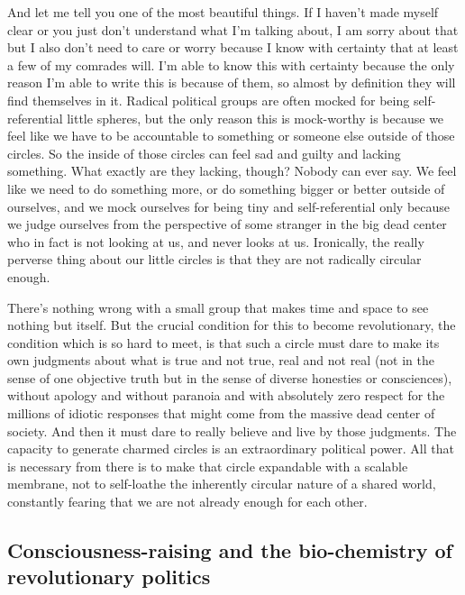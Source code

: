 \documentclass[a4paper,12pt,margin=.5in]{article}
\begin{document}
And let me tell you one of the most beautiful things. If I haven't made
myself clear or you just don't understand what I'm talking about, I am
sorry about that but I also don't need to care or worry because I know
with certainty that at least a few of my comrades will. I'm able to know
this with certainty because the only reason I'm able to write this is
because of them, so almost by definition they will find themselves in
it. Radical political groups are often mocked for being self-referential
little spheres, but the only reason this is mock-worthy is because we
feel like we have to be accountable to something or someone else outside
of those circles. So the inside of those circles can feel sad and guilty
and lacking something. What exactly are they lacking, though? Nobody can
ever say. We feel like we need to do something more, or do something
bigger or better outside of ourselves, and we mock ourselves for being
tiny and self-referential only because we judge ourselves from the
perspective of some stranger in the big dead center who in fact is not
looking at us, and never looks at us. Ironically, the really perverse
thing about our little circles is that they are not radically circular
enough.

There's nothing wrong with a small group that makes time and space to
see nothing but itself. But the crucial condition for this to become
revolutionary, the condition which is so hard to meet, is that such a
circle must dare to make its own judgments about what is true and not
true, real and not real (not in the sense of one objective truth but in
the sense of diverse honesties or consciences), without apology and
without paranoia and with absolutely zero respect for the millions of
idiotic responses that might come from the massive dead center of
society. And then it must dare to really believe and live by those
judgments. The capacity to generate charmed circles is an extraordinary
political power. All that is necessary from there is to make that circle
expandable with a scalable membrane, not to self-loathe the inherently
circular nature of a shared world, constantly fearing that we are not
already enough for each other.

\subsection{Consciousness-raising and the bio-chemistry of revolutionary
politics}\label{consciousness-raising-and-the-bio-chemistry-of-revolutionary-politics}
\end{document}
